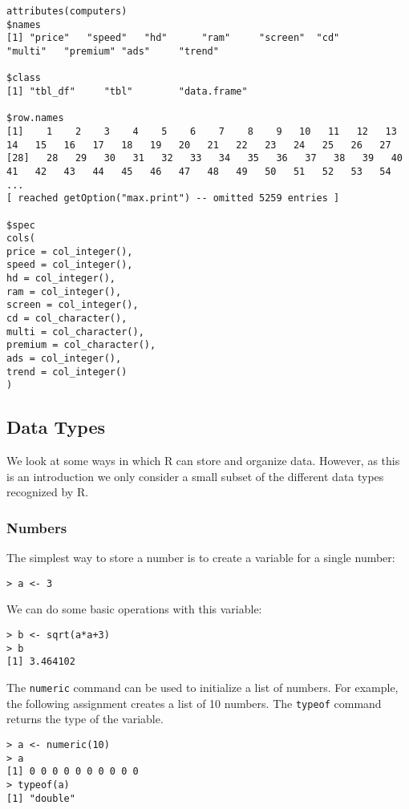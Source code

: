 \begin{lstlisting}[breaklines=true]
attributes(computers)
$names
[1] "price"   "speed"   "hd"      "ram"     "screen"  "cd"      "multi"   "premium" "ads"     "trend"  

$class
[1] "tbl_df"     "tbl"        "data.frame"

$row.names
[1]    1    2    3    4    5    6    7    8    9   10   11   12   13   14   15   16   17   18   19   20   21   22   23   24   25   26   27
[28]   28   29   30   31   32   33   34   35   36   37   38   39   40   41   42   43   44   45   46   47   48   49   50   51   52   53   54
...
[ reached getOption("max.print") -- omitted 5259 entries ]

$spec
cols(
price = col_integer(),
speed = col_integer(),
hd = col_integer(),
ram = col_integer(),
screen = col_integer(),
cd = col_character(),
multi = col_character(),
premium = col_character(),
ads = col_integer(),
trend = col_integer()
)

\end{lstlisting}

\subsection{Data Types}

We look at some ways in which R can store and organize data. 
However, as this is an introduction we only consider a small subset of the different data types recognized by R.

\subsubsection{Numbers}

The simplest way to store a number is to create a variable for a single number:
\begin{lstlisting}
> a <- 3
\end{lstlisting}

We can do some basic operations with this variable:
\begin{lstlisting}
> b <- sqrt(a*a+3)
> b
[1] 3.464102
\end{lstlisting}

The \texttt{numeric} command can be used to initialize a list of numbers. For example, the following assignment creates a list of 10 numbers. The \texttt{typeof} command returns the type of the variable.
\begin{lstlisting}
> a <- numeric(10)
> a
[1] 0 0 0 0 0 0 0 0 0 0
> typeof(a)
[1] "double"
\end{lstlisting}

